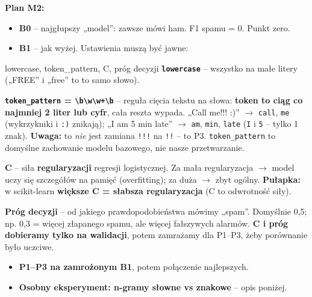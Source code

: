 \documentclass[11pt,a4paper]{article}
\begin{document}
\textbf{Plan M2:}
\begin{itemize}
  \item \textbf{B0} -- najgłupszy „model”: zawsze mówi ham. F1 spamu = 0. Punkt zero.
  \item \textbf{B1} -- jak wyżej. Ustawienia muszą być jawne:
\end{itemize}

\begin{pojecie}{lowercase, token\_pattern, C, próg decyzji}
\textbf{\texttt{lowercase}} -- wszystko na małe litery („FREE” i „free” to to samo słowo).

\textbf{\texttt{token\_pattern} = \texttt{\textbackslash b\textbackslash w\textbackslash w+\textbackslash b}} -- reguła cięcia
tekstu na słowa: \textbf{token to ciąg co najmniej 2 liter lub cyfr}, cała reszta wypada.
„Call me!!! :)” $\to$ \texttt{call}, \texttt{me} (wykrzykniki i \texttt{:)} znikają);
„I am 5 min late” $\to$ \texttt{am}, \texttt{min}, \texttt{late} (\texttt{I} i \texttt{5} -- tylko 1 znak).
\textbf{Uwaga:} to \emph{nie} jest zamiana \texttt{!!!} na \texttt{!!} -- to P3. \texttt{token\_pattern} to domyślne
zachowanie modelu bazowego, nie nasze przetwarzanie.

\textbf{C} -- siła \textbf{regularyzacji} regresji logistycznej. Za mała regularyzacja $\to$ model uczy się szczegółów na
pamięć (overfitting); za duża $\to$ zbyt ogólny. \textbf{Pułapka:} w scikit-learn \textbf{większe C = słabsza regularyzacja}
(C to odwrotność siły).

\textbf{Próg decyzji} -- od jakiego prawdopodobieństwa mówimy „spam”. Domyślnie 0,5; np. 0,3 = więcej złapanego spamu,
ale więcej fałszywych alarmów. \textbf{C i próg dobieramy tylko na walidacji}, potem zamrażamy dla P1--P3, żeby porównanie
było uczciwe.
\end{pojecie}

\begin{itemize}
  \item \textbf{P1--P3 na zamrożonym B1}, potem połączenie najlepszych.
  \item \textbf{Osobny eksperyment: n-gramy słowne vs znakowe} -- opis poniżej.
\end{itemize}
\end{document}
